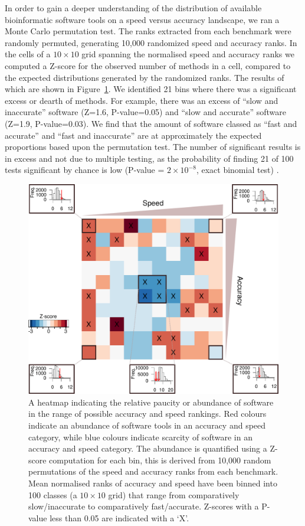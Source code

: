\documentclass[fleqn,10pt]{SelfArx} %
\begin{document}
In order to gain a deeper understanding of the distribution of available bioinformatic software tools on a speed versus accuracy landscape, we ran a Monte Carlo permutation test. The ranks extracted from each benchmark were randomly permuted, generating 10,000 randomized speed and accuracy ranks. In the cells of a $10\times10$ grid spanning the normalised speed and accuracy ranks we computed a Z-score for the observed number of methods in a cell, compared to the expected distributions generated by the randomized ranks. The results of which are shown in Figure~\ref{fig:speedaccuracy}. We identified 21 bins where there was a significant excess or dearth of methods. For example, there was an excess of “slow and inaccurate” software (Z=1.6, P-value=0.05) and “slow and accurate” software (Z=1.9, P-value=0.03). We find that the amount of software classed as “fast and accurate” and “fast and inaccurate” are at approximately the expected proportions based upon the permutation test. The number of significant results is in excess and not due to multiple testing, as the probability of finding 21 of 100 tests significant by chance is low (P-value = $2\times 10^{-8}$, exact binomial test) \cite{Moran2003-ve}.


\begin{figure}
\includegraphics[width=\textwidth]{figure2.pdf}
\caption{A heatmap indicating the relative paucity or abundance of software in the range of possible accuracy and speed rankings. Red colours indicate an abundance of software tools in an accuracy and speed category, while blue colours indicate scarcity of software in an accuracy and speed category. The abundance is quantified using a Z-score computation for each bin, this is derived from 10,000 random permutations of the speed and accuracy ranks from each benchmark. Mean normalised ranks of accuracy and speed have been binned into 100 classes (a $10\times10$ grid) that range from comparatively slow/inaccurate to comparatively fast/accurate. Z-scores with a P-value less than 0.05 are indicated with a ‘X’.}
\label{fig:speedaccuracy}
\end{figure}
\end{document}

